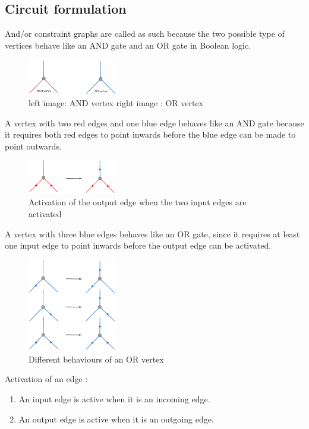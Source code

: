 \subsection{Circuit formulation}
And/or constraint graphs are called as such because the two possible type of vertices behave like an AND gate and an OR gate in Boolean logic. 

\begin{figure}[H]
\centering
\includegraphics[width=0.35\textwidth]{res/andOrVertex.pdf}
\caption{left image: AND vertex     right image : OR vertex}
\label{fig:circle}
\end{figure}

A vertex with two red edges and one blue edge behaves like an AND gate because it requires both red edges to point inwards before the blue edge can be made to point outwards. 
\begin{figure}[H]
\centering
\includegraphics[width=0.35\textwidth]{res/andVertex.pdf}
\caption{Activation of the output edge when the two input edges are activated}
\label{fig:circle}
\end{figure}

A vertex with three blue edges behaves like an OR gate, since it requires at least one input edge to point inwards before the output edge can be activated.
\begin{figure}[H]
\centering
\includegraphics[width=0.35\textwidth]{res/orVertex.pdf}
\caption{Different behaviours of an OR vertex}
\label{fig:circle}
\end{figure}

\begin{defn}
Activation of an edge :  
\begin{enumerate}
    \item An input edge is active when it is an incoming edge. 
    \item An output edge is active when it is an outgoing edge.
\end{enumerate}
\end{defn}

